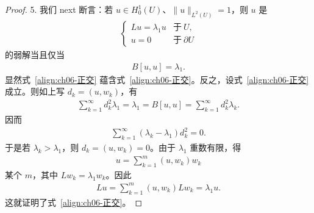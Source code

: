 \documentclass[../../main.tex]{subfiles}
\begin{document}
\begin{proof}
5. 我们 next 断言：若 $u\in H^{1}_{0}(U)$、$\|u\|_{L^{2}(U)}=1$，则 $u$ 是
\begin{align}
\begin{cases}
Lu=\lambda_{1}u & \text{于}\ U,\\
u=0 & \text{于}\ \partial U
\end{cases}
\end{align}
的弱解当且仅当
\begin{align}
B[u,u]=\lambda_{1}.
\end{align}
显然式~\eqref{align:ch06-正交} 蕴含式~\eqref{align:ch06-正交}。反之，设式~\eqref{align:ch06-正交} 成立。则如上写 $d_{k}=(u,w_{k})$，有
\begin{align}
\sum_{k=1}^{\infty}d_{k}^{2}\lambda_{1}=\lambda_{1}=B[u,u]=\sum_{k=1}^{\infty}d_{k}^{2}\lambda_{k}.
\end{align}
因而
\begin{align}
\sum_{k=1}^{\infty}(\lambda_{k}-\lambda_{1})d_{k}^{2}=0.
\end{align}
于是若 $\lambda_{k}>\lambda_{1}$，则 $d_{k}=(u,w_{k})=0$。由于 $\lambda_{1}$ 重数有限，得
\begin{align}
u=\sum_{k=1}^{m}(u,w_{k})w_{k}
\end{align}
某个 $m$，其中 $Lw_{k}=\lambda_{1}w_{k}$。因此
\begin{align}
Lu=\sum_{k=1}^{m}(u,w_{k})Lw_{k}=\lambda_{1}u.
\end{align}
这就证明了式~\eqref{align:ch06-正交}。


\end{proof}
\end{document}
